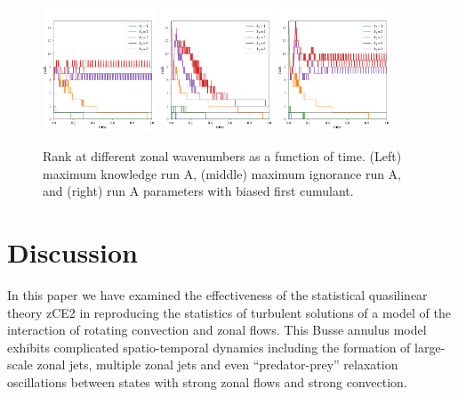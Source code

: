 \documentclass{jfm}
\begin{document}
\begin{figure}
    \centering
    \includegraphics[width=0.3\textwidth]{rank_vs_t_run_A_max_knowl_kx.pdf}
    \includegraphics[width=0.3\textwidth]{rank_vs_t_run_A_DSS_max_ig_kx.pdf}
    \includegraphics[width=0.3\textwidth]{rank_vs_t_run_I_kx.pdf}
    \caption{Rank at different zonal wavenumbers as a function of time. (Left) maximum knowledge run A, (middle) maximum ignorance run A, and (right) run A parameters with biased first cumulant.}
    \label{fig:rank_runs}
\end{figure}

\section{Discussion}
\label{sec:discussion}

In this paper we have examined the effectiveness of the statistical quasilinear theory zCE2 in reproducing the statistics of turbulent solutions of a model of the interaction of rotating convection and zonal flows. This Busse annulus model exhibits complicated spatio-temporal dynamics including the formation of large-scale zonal jets, multiple zonal jets and even ``predator-prey'' relaxation oscillations between states with strong zonal flows and strong convection.
\end{document}
